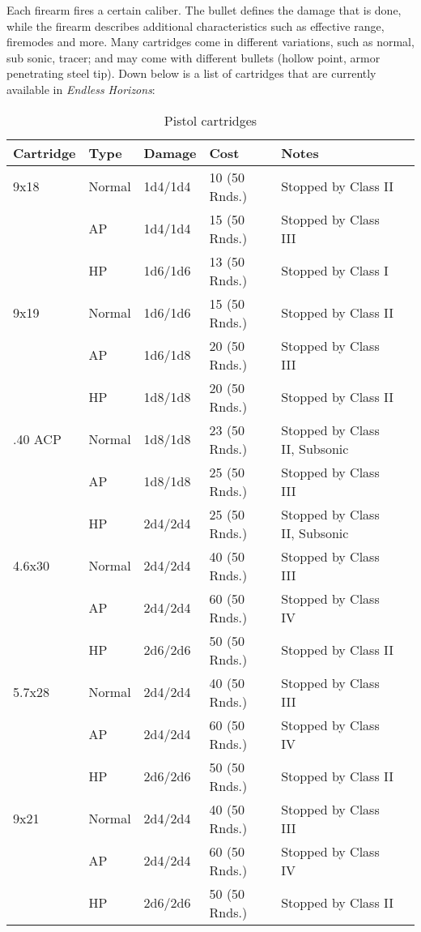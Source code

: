 Each firearm fires a certain caliber. The bullet defines the damage that is
done, while the firearm describes additional characteristics such as effective
range, firemodes and more. Many cartridges come in different variations, such as
normal, sub sonic, tracer; and may come with different bullets (hollow point,
armor penetrating steel tip). Down below is a list of cartridges that are
currently available in \emph{Endless Horizons}:

\begin{table}
  \caption{Pistol cartridges}
  \begin{center}
    \begin{tabular}{| l | l | l | l | l | l |}
      \hline
      \textbf{Cartridge}  & \textbf{Type}   & \textbf{Damage} &
      \textbf{Cost}  & \textbf{Notes} \\ \hline

      9x18    & Normal & 1d4/1d4  & 10 (50 Rnds.) & Stopped by Class II \\ \hline
      \,      & AP     & 1d4/1d4  & 15 (50 Rnds.) & Stopped by Class III \\ \hline
      \,      & HP     & 1d6/1d6  & 13 (50 Rnds.) & Stopped by Class I \\ \hline
      9x19    & Normal & 1d6/1d6  & 15 (50 Rnds.) & Stopped by Class II \\ \hline
      \,      & AP     & 1d6/1d8  & 20 (50 Rnds.) & Stopped by Class III \\ \hline
      \,      & HP     & 1d8/1d8  & 20 (50 Rnds.) & Stopped by Class II \\ \hline
      .40 ACP & Normal & 1d8/1d8  & 23 (50 Rnds.) & Stopped by Class II, Subsonic \\ \hline
      \,      & AP     & 1d8/1d8  & 25 (50 Rnds.) & Stopped by Class III \\ \hline
      \,      & HP     & 2d4/2d4  & 25 (50 Rnds.) & Stopped by Class II, Subsonic \\ \hline
      4.6x30  & Normal & 2d4/2d4  & 40 (50 Rnds.) & Stopped by Class III \\ \hline
      \,      & AP     & 2d4/2d4  & 60 (50 Rnds.) & Stopped by Class IV \\ \hline
      \,      & HP     & 2d6/2d6  & 50 (50 Rnds.) & Stopped by Class II \\ \hline
      5.7x28  & Normal & 2d4/2d4  & 40 (50 Rnds.) & Stopped by Class III \\ \hline
      \,      & AP     & 2d4/2d4  & 60 (50 Rnds.) & Stopped by Class IV \\ \hline
      \,      & HP     & 2d6/2d6  & 50 (50 Rnds.) & Stopped by Class II \\ \hline
      9x21    & Normal & 2d4/2d4  & 40 (50 Rnds.) & Stopped by Class III \\ \hline
      \,      & AP     & 2d4/2d4  & 60 (50 Rnds.) & Stopped by Class IV \\ \hline
      \,      & HP     & 2d6/2d6  & 50 (50 Rnds.) & Stopped by Class II \\ \hline

    \end{tabular}
  \end{center}
\end{table}

